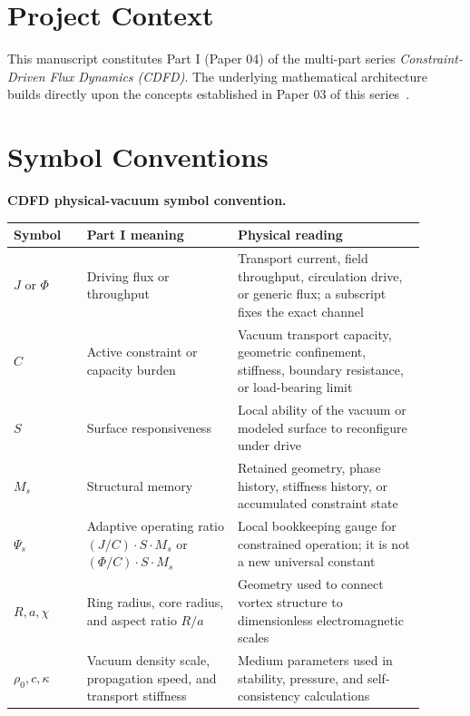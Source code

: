 \documentclass[11pt]{article}
\begin{document}
\section*{Project Context}
This manuscript constitutes Part I (Paper 04) of the multi-part series
\textit{Constraint-Driven Flux Dynamics (CDFD)}. The underlying mathematical
architecture builds directly upon the concepts established in Paper 03 of this
series~\cite{MujjabiIII2026}.

\section*{Symbol Conventions}

\noindent\textbf{CDFD physical-vacuum symbol convention.}
\begin{center}
{\small
\begin{tabular}{p{0.16\linewidth}p{0.33\linewidth}p{0.41\linewidth}}
\hline
Symbol & Part I meaning & Physical reading \\
\hline
$J$ or $\Phi$ & Driving flux or throughput & Transport current, field throughput, circulation drive, or generic flux; a subscript fixes the exact channel \\
$C$ & Active constraint or capacity burden & Vacuum transport capacity, geometric confinement, stiffness, boundary resistance, or load-bearing limit \\
$S$ & Surface responsiveness & Local ability of the vacuum or modeled surface to reconfigure under drive \\
$M_s$ & Structural memory & Retained geometry, phase history, stiffness history, or accumulated constraint state \\
$\Psi_s$ & Adaptive operating ratio $(J/C)\cdot S\cdot M_s$ or $(\Phi/C)\cdot S\cdot M_s$ & Local bookkeeping gauge for constrained operation; it is not a new universal constant \\
$R,a,\chi$ & Ring radius, core radius, and aspect ratio $R/a$ & Geometry used to connect vortex structure to dimensionless electromagnetic scales \\
$\rho_0,c,\kappa$ & Vacuum density scale, propagation speed, and transport stiffness & Medium parameters used in stability, pressure, and self-consistency calculations \\
\hline
\end{tabular}
}
\end{center}
\end{document}
